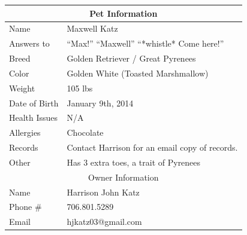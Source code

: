 \documentclass[pdftex,12pt]{article}
\begin{document}
\begin{table}[H]
    \begin{longtable}{@{}ll@{}}
        \toprule
        \multicolumn{2}{c}{Pet Information}                                                                                    \\ \midrule
        Name          & Maxwell Katz                                                                                           \\
        Answers to    & ``Max!'' ``Maxwell'' ``*whistle* Come here!''                                                                \\
        Breed         & Golden Retriever / Great Pyrenees                                                                      \\
        Color         & Golden White (Toasted Marshmallow)                                                                    \\
        Weight        & 105 lbs                                                                                                \\
        Date of Birth & January 9th, 2014                                                                                      \\
        Health Issues & N/A                                                                                                    \\
        Allergies     & Chocolate                                                                                              \\
        Records       & Contact Harrison for an email copy of records.                                                         \\
        Other         & Has 3 extra toes, a trait of Pyrenees                                                                  \\ \midrule
        \multicolumn{2}{c}{Owner Information}                                                                                  \\ \midrule
        Name          & Harrison John Katz                                                                                     \\
        Phone \#      & 706.801.5289                                                                                           \\
        Email         & hjkatz03@gmail.com                                                                                     \\ \midrule

\end{longtable}
\end{table}
\end{document}
